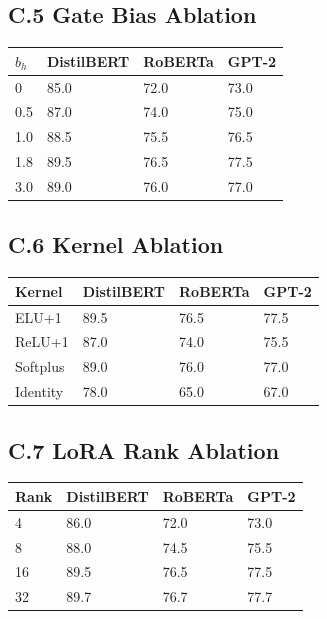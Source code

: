 \subsection{C.5 Gate Bias Ablation}

\begin{table}[H]
\centering
\small
\begin{tabular}{llll}
\toprule
\textbf{$b_h$} & \textbf{DistilBERT} & \textbf{RoBERTa} & \textbf{GPT-2} \\
\midrule
0 & 85.0 & 72.0 & 73.0 \\
0.5 & 87.0 & 74.0 & 75.0 \\
1.0 & 88.5 & 75.5 & 76.5 \\
1.8 & 89.5 & 76.5 & 77.5 \\
3.0 & 89.0 & 76.0 & 77.0 \\
\bottomrule
\end{tabular}
\end{table}

\subsection{C.6 Kernel Ablation}

\begin{table}[H]
\centering
\small
\begin{tabular}{llll}
\toprule
\textbf{Kernel} & \textbf{DistilBERT} & \textbf{RoBERTa} & \textbf{GPT-2} \\
\midrule
ELU+1 & 89.5 & 76.5 & 77.5 \\
ReLU+1 & 87.0 & 74.0 & 75.5 \\
Softplus & 89.0 & 76.0 & 77.0 \\
Identity & 78.0 & 65.0 & 67.0 \\
\bottomrule
\end{tabular}
\end{table}

\subsection{C.7 LoRA Rank Ablation}

\begin{table}[H]
\centering
\small
\begin{tabular}{llll}
\toprule
\textbf{Rank} & \textbf{DistilBERT} & \textbf{RoBERTa} & \textbf{GPT-2} \\
\midrule
4 & 86.0 & 72.0 & 73.0 \\
8 & 88.0 & 74.5 & 75.5 \\
16 & 89.5 & 76.5 & 77.5 \\
32 & 89.7 & 76.7 & 77.7 \\
\bottomrule
\end{tabular}
\end{table}

